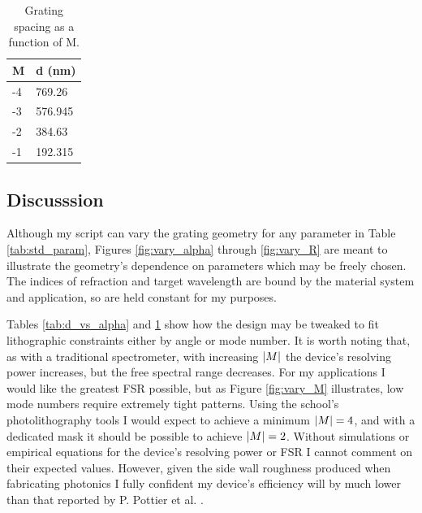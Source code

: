 \documentclass{article}
\begin{document}
    \begin{table}[H]
    \centering
    \caption{Grating spacing as a function of M.}
    \label{tab:vary_m}
    \begin{tabular}{|l|l|}
    \hline
    M  & d (nm)  \\ \hline
    -4 & 769.26  \\ \hline
    -3 & 576.945 \\ \hline
    -2 & 384.63  \\ \hline
    -1 & 192.315 \\ \hline
    \end{tabular}
    \end{table}
    
    \subsection{Discusssion}
    Although my script can vary the grating geometry for any parameter in Table \ref{tab:std_param}, Figures \ref{fig:vary_alpha} through \ref{fig:vary_R} are meant to illustrate the geometry's dependence on parameters which may be freely chosen. The indices of refraction and target wavelength are bound by the material system and application, so are held constant for my purposes. 
    
    Tables \ref{tab:d_vs_alpha} and \ref{tab:vary_m} show how the design may be tweaked to fit lithographic constraints either by angle or mode number. It is worth noting that, as with a traditional spectrometer, with increasing $\abs{M}$ the device's resolving power increases, but the free spectral range decreases. For my applications I would like the greatest FSR possible, but as Figure \ref{fig:vary_M} illustrates, low mode numbers require extremely tight patterns. Using the school's photolithography tools I would expect to achieve a minimum $\abs{M} = 4$, and with a dedicated mask it should be possible to achieve $\abs{M} = 2$. Without simulations or empirical equations for the device's resolving power or FSR I cannot comment on their expected values. However, given the side wall roughness produced when fabricating photonics I fully confident my device's efficiency will by much lower than that reported by P. Pottier et al. \cite{Packirisamy2012Mono-OrderGrating}.
    
\clearpage
\newpage



\end{document}
